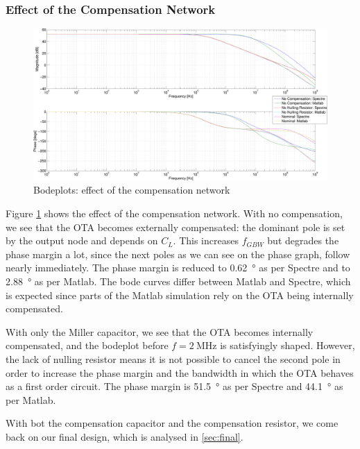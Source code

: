 \documentclass[english,10pt]{article}
\begin{document}
\subsubsection{Effect of the Compensation Network}
\begin{figure}[htbp]
  \centering
  \includegraphics[width = \textwidth]{6_2.pdf}
  \caption{Bodeplots: effect of the compensation network\label{fig:comp}}
\end{figure}
Figure \ref{fig:comp} shows the effect of the compensation network. With no compensation, we see that the OTA becomes externally compensated: the dominant pole is set by the output node and depends on $C_L$. This increases $f_{GBW}$ but degrades the phase margin a lot, since the next poles as we can see on the phase graph, follow nearly immediately. The phase margin is reduced to \SI{0.62}{\degree} as per Spectre and to \SI{2.88}{\degree} as per Matlab. The bode curves differ between Matlab and Spectre, which is expected since parts of the Matlab simulation rely on the OTA being internally compensated.

With only the Miller capacitor, we see that the OTA becomes internally compensated, and the bodeplot before $f = \SI{2}{\mega\hertz}$ is satisfyingly shaped. However, the lack of nulling resistor means it is not possible to cancel the second pole in order to increase the phase margin and the bandwidth in which the OTA behaves as a first order circuit. The phase margin is \SI{51.5}{\degree} as per Spectre and \SI{44.1}{\degree} as per Matlab.

With bot the compensation capacitor and the compensation resistor, we come back on our final design, which is analysed in \ref{sec:final}.
\end{document}
